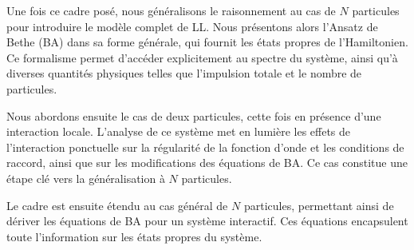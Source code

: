 
\medskip
Une fois ce cadre posé, nous généralisons le raisonnement au cas de \(N\) particules pour introduire le modèle complet de \acrlong{LL}. Nous présentons alors l'Ansatz de Bethe (\gls{BA}) dans sa forme générale, qui fournit les états propres de l’Hamiltonien. Ce formalisme permet d’accéder explicitement au spectre du système, ainsi qu’à diverses quantités physiques telles que l’impulsion totale et le nombre de particules.


\medskip
Nous abordons ensuite le cas de deux particules, cette fois en présence d’une interaction locale. L’analyse de ce système met en lumière les effets de l’interaction ponctuelle sur la régularité de la fonction d’onde et les conditions de raccord, ainsi que sur les modifications des équations de \gls{BA}. Ce cas constitue une étape clé vers la généralisation à \(N\) particules.


\medskip

Le cadre est ensuite étendu au cas général de \(N\) particules, permettant ainsi de dériver les équations de \gls{BA} pour un système interactif. Ces équations encapsulent toute l’information sur les états propres du système.


